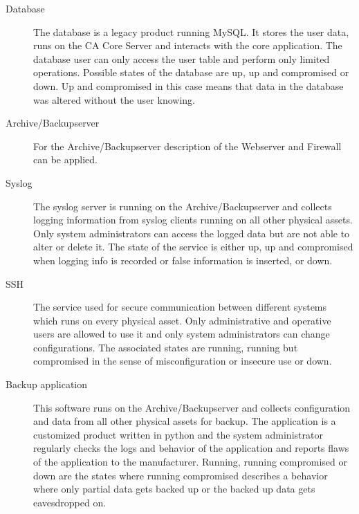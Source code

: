 \documentclass[a4paper, toc=index, 12pt, DIV14, twoside, BCOR2cm, headsepline, numbers=noenddot, bibliography=totoc]{scrbook}
\begin{document}
\begin{description}
\item[Database ] The database is a legacy product running MySQL. It stores the user data, runs on the CA Core Server and interacts with the core application. The database user can only access the user table and perform only limited operations. Possible states of the database are up, up and compromised or down. Up and compromised in this case means that data in the database was altered without the user knowing.
\item[Archive/Backupserver ] For the Archive/Backupserver description of the Webserver and Firewall can be applied.
\item[Syslog ] The syslog server is running on the Archive/Backupserver and collects logging information from syslog clients running on all other physical assets. Only system administrators can access the logged data but are not able to alter or delete it. The state of the service is either up, up and compromised when logging info is recorded or false information is inserted, or down.
\item[SSH ] The service used for secure communication between different systems which runs on every physical asset. Only administrative and operative users are allowed to use it and only system administrators can change configurations. The associated states are running, running but compromised in the sense of misconfiguration or insecure use or down.
\item[Backup application ] This software runs on the Archive/Backupserver and collects configuration and data from all other physical assets for backup. The application is a customized product written in python and the system administrator regularly checks the logs and behavior of the application and reports flaws of the application to the manufacturer. Running, running compromised or down are the states where running compromised describes a behavior where only partial data gets backed up or the backed up data gets eavesdropped on.
\end{description}
\end{document}
